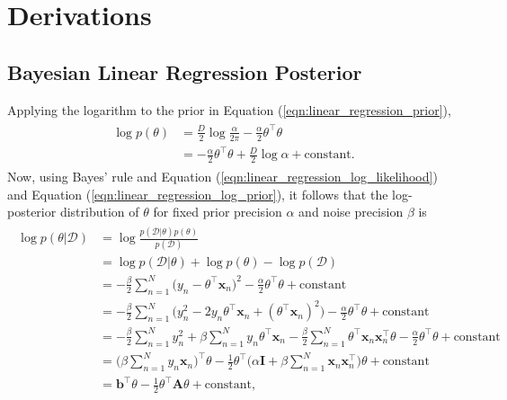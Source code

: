 \documentclass[msc,deptreport.inf]{infthesis} %
\newcommand{\matr}[1]{\mathbf{#1}}
\begin{document}



 \appendix
 
 \chapter{Derivations}
 
 \section{Bayesian Linear Regression Posterior}\label{app:bayesian_linear_regression_posterior}
 
Applying the logarithm to the prior in Equation (\ref{eqn:linear_regression_prior}), 
\begin{align}\label{eqn:linear_regression_log_prior}
\begin{split}
	\log p(\theta) 
	& = \frac{D}{2} \log \frac{\alpha}{2\pi} - \frac{\alpha}{2} \theta^\intercal \theta \\
	& = -\frac{\alpha}{2} \theta^\intercal \theta + \frac{D}{2} \log \alpha + \text{constant}.
\end{split}
\end{align}
Now, using Bayes' rule and Equation (\ref{eqn:linear_regression_log_likelihood}) and Equation (\ref{eqn:linear_regression_log_prior}), it follows that the log-posterior distribution of $\theta$ for fixed prior precision $\alpha$ and noise precision $\beta$ is 
\begin{align}\label{eqn:linear_regression_log_posterior}
\begin{split}
	\log p(\theta | \mathcal{D}) 
	& = \log \frac{p(\mathcal{D} | \theta) p(\theta)}{p(\mathcal{D})} \\
	& = \log p(\mathcal{D} | \theta) + \log p(\theta) - \log p(\mathcal{D}) \\
	& = -\frac{\beta}{2} \sum_{n=1}^N \big(y_n - \theta^\intercal \matr{x}_n \big)^2 
	-\frac{\alpha}{2} \theta^\intercal \theta 
	+ \text{constant} \\
	& = -\frac{\beta}{2} \sum_{n=1}^N\big( y_n^2 - 2 y_n \theta^\intercal \matr{x}_n + (\theta^\intercal \matr{x}_n)^2 \big)
	-\frac{\alpha}{2} \theta^\intercal \theta
	+ \text{constant} \\
	& = -\frac{\beta}{2} \sum_{n=1}^N y_n^2
	+ \beta \sum_{n=1}^N y_n \theta^\intercal \matr{x}_n
	-\frac{\beta}{2} \sum_{n=1}^N \theta^\intercal \matr{x}_n \matr{x}_n^\intercal \theta
	-\frac{\alpha}{2} \theta^\intercal \theta
	+ \text{constant} \\
	& = \Big(\beta \sum_{n=1}^N y_n \matr{x}_n \Big)^\intercal \theta 
	-\frac{1}{2} \theta^\intercal \Big( \alpha \matr{I} + \beta \sum_{n=1}^N \matr{x}_n \matr{x}_n^\intercal \Big) \theta 
	+ \text{constant} \\
	& = \matr{b}^\intercal \theta 
	- \frac{1}{2} \theta^\intercal \matr{A} \theta 
	+ \text{constant},
\end{split}
\end{align}
\end{document}
